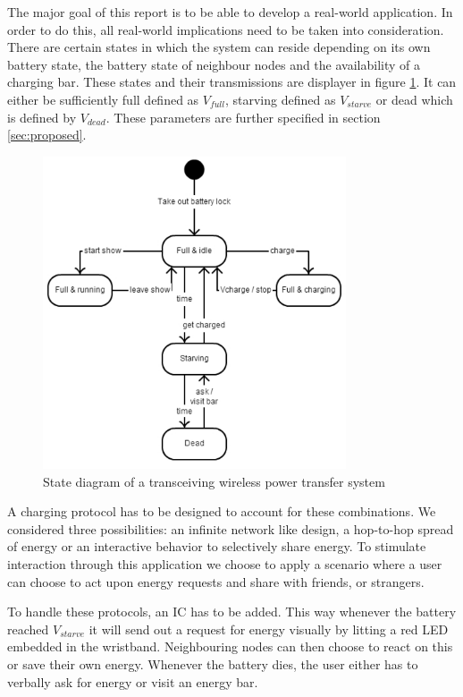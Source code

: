 
The major goal of this report is to be able to develop a real-world application. In order to do this, all real-world implications need to be taken into consideration. There are certain states in which the system can reside depending on its own battery state, the battery state of neighbour nodes and the availability of a charging bar. These states and their transmissions are displayer in figure \ref{fig:states}. It can either be sufficiently full defined as $V_{full}$, starving defined as $V_{starve}$ or dead which is defined by $V_{dead}$. These parameters are further specified in section \ref{sec:proposed}.

\begin{figure}[h!]
\centering
\includegraphics[width=0.8\textwidth]{statediagram.pdf}
\caption{State diagram of a transceiving wireless power transfer system}
\label{fig:states}
\end{figure}

A charging protocol has to be designed to account for these combinations. We considered three possibilities: an infinite network like design, a hop-to-hop spread of energy or an interactive behavior to selectively share energy. To stimulate interaction through this application we choose to apply a scenario where a user can choose to act upon energy requests and share with friends, or strangers.

To handle these protocols, an IC has to be added. This way whenever the battery reached $V_{starve}$ it will send out a request for energy visually by litting a red LED embedded in the wristband. Neighbouring nodes can then choose to react on this or save their own energy. Whenever the battery dies, the user either has to verbally ask for energy or visit an energy bar.
